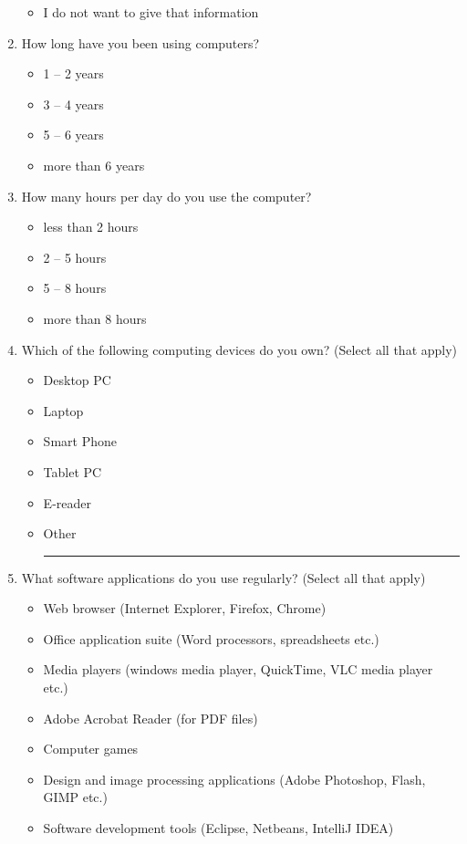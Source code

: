 \begin{enumerate}[topsep=-4em]
\begin{itemize}[topsep=-6em, label={o}]
\item I do not want to give that information
\end{itemize}
\item How long have you been using computers?
\begin{itemize}[topsep=-6em, label={o}]
\itemsep-1em 
\item 1 -- 2 years
\item 3 -- 4 years
\item 5 -- 6 years
\item more than 6 years
\end{itemize}
\item How many hours per day do you use the computer?
\begin{itemize}[topsep=-6em, label={o}]
\itemsep-1em 
\item less than 2 hours
\item 2 -- 5 hours
\item 5 -- 8 hours
\item more than 8 hours
\end{itemize}
\item Which of the following computing devices do you own? (Select all that apply)
\begin{itemize}[topsep=-6em, label={o}]
\itemsep-1em 
\item Desktop PC
\item Laptop
\item Smart Phone
\item Tablet PC
\item E-reader
\item Other \rule{4cm}{0.4pt}
\end{itemize}
\item What software applications do you use regularly? (Select all that apply)
\begin{itemize}[topsep=-6em, label={o}]
\itemsep-1em 
\item Web browser (Internet Explorer, Firefox, Chrome)
\item Office application suite (Word processors, spreadsheets etc.)
\item Media players (windows media player, QuickTime, VLC media player etc.)
\item Adobe Acrobat Reader (for PDF files)
\item Computer games
\item Design and image processing applications (Adobe Photoshop, Flash, GIMP etc.)
\item Software development tools (Eclipse, Netbeans, IntelliJ IDEA)

\end{itemize}
\end{enumerate}
